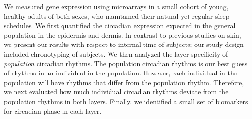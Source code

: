 We measured gene expression using microarrays in a small cohort of young, healthy adults of both sexes, who maintained their natural yet regular sleep schedules. We first quantified the circadian expression expected in the general population in the epidermis and dermis. In contrast to previous studies on skin, we present our results with respect to internal time of subjects; our study design included chronotyping of subjects. We then analyzed the layer-specificity of \textit{population} circadian rhythms. The population circadian rhythms is our best guess of rhythms in an individual in the population. However, each individual in the population will have rhythms that differ from the population rhythm. Therefore, we next evaluated how much individual circadian rhythms deviate from the population rhythms in both layers. Finally, we identified a small set of biomarkers for circadian phase in each layer.




